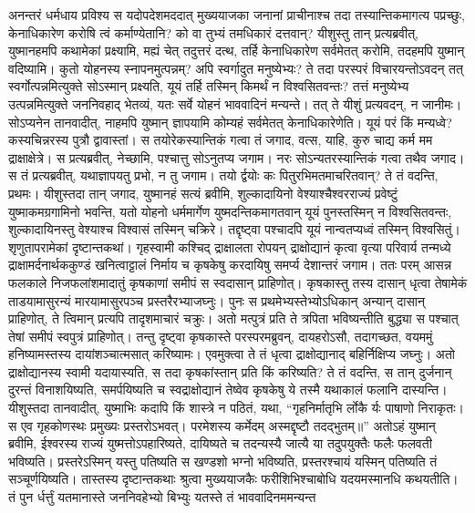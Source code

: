 \vakya अनन्तरं धर्मधाय प्रविश्य स यदोपदेशमददात् मुख्ययाजका जनानां प्राचीनाश्च तदा तस्यान्तिकमागत्य पप्रच्छुः, केनाधिकारेण करोषि त्वं कर्माण्येतानि? को वा तुभ्यं तमधिकारं दत्तवान्?
\vakya यीशुस्तु तान् प्रत्यब्रवीत्, युष्मानहमपि कथामेकां प्रक्ष्यामि, मह्यं चेत् तदुत्तरं दत्थ, तर्हि केनाधिकारेण सर्वमेतत् करोमि, तदहमपि युष्मान् वदिष्यामि।
\vakya कुतो योहनस्य स्नापनमुत्पन्नम्? अपि स्वर्गादुत मनुष्येभ्यः? ते तदा परस्परं विचारयन्तोऽवदन् तत् स्वर्गोत्पन्नमित्युक्ते सोऽस्मान् प्रक्ष्यति, यूयं तर्हि तस्मिन् किमर्थं न विश्वसितवन्तः?
\vakya तत्तं मनुष्येभ्य उत्पन्नमित्युक्ते जननिवहाद् भेतव्यं, यतः सर्वे योहनं भाववादिनं मन्यन्ते।
\vakya तत् ते यीशुं प्रत्यवदन्, न जानीमः। सोऽप्यनेन तानवादीत्, नाहमपि युष्मान् ज्ञापयामि कोम्यहं सर्वमेतत् केनाधिकारेणेति।
\vakya यूयं परं किं मन्यध्वे? कस्यचिन्नरस्य पुत्रौ द्वावास्तां। स तयोरेकस्यान्तिकं गत्वा तं जगाद, वत्स, याहि, कुरु चाद्य कर्म मम द्राक्षाक्षेत्रे।
\vakya स प्रत्यब्रवीत्, नेच्छामि, पश्चात्तु सोऽनुतप्य जगाम।
\vakya नरः सोऽन्यतरस्यान्तिकं गत्वा तथैव जगाद। स तं प्रत्यब्रवीत्, यथाज्ञापयतु प्रभो, न तु जगाम।
\vakya तयो र्द्वयोः कः पितुरभिमतमाचरितवान्? ते तं वदन्ति, प्रथमः। यीशुस्तदा तान् जगाद, युष्मानहं सत्यं ब्रवीमि, शुल्कादायिनो वेश्याश्चैश्वरराज्यं प्रवेष्टुं युष्माकमग्रगामिनो भवन्ति,
\vakya यतो योहनो धर्ममार्गेण युष्मदन्तिकमागतवान् यूयं पुनस्तस्मिन् न विश्वसितवन्तः, शुल्कादायिनस्तु वेश्याश्च विश्वासं तस्मिन् चक्रिरे। तद्दृष्ट्वा पश्चादपि यूयं नान्वतप्यध्वं तस्मिन् विश्वसितुं।
\vakya शृणुतापरामेकां दृष्टान्तकथां। गृहस्वामी कश्चिद् द्राक्षालता रोपयन् द्राक्षोद्यानं कृत्वा वृत्या परिवार्य तन्मध्ये द्राक्षामर्दनार्थककुण्डं खनित्वाट्टालं निर्माय च कृषकेषु करदायिषु समर्प्य देशान्तरं जगाम।
\vakya ततः परम् आसन्न फलकाले निजफलांशमादातुं कृषकाणां समीपं स स्वदासान् प्राहिणोत्।
\vakya कृषकास्तु तस्य दासान् धृत्वा तेषामेकं ताडयामासुरन्यं मारयामासुरपञ्च प्रस्तरैरभ्याजघ्नुः।
\vakya पुनः स प्रथमेभ्यस्तेभ्योऽधिकान् अन्यान् दासान् प्राहिणोत्, ते त्विमान् प्रत्यपि तादृशमाचारं चक्रुः।
\vakya अतो मत्पुत्रं प्रति ते त्रपिता भविष्यन्तीति बुद्ध्या स पश्चात् तेषां समीपं स्वपुत्रं प्राहिणोत्।
\vakya तन्तु दृष्ट्वा कृषकास्ते परस्परमब्रुवन्, दायहरोऽसौ, तदागच्छत, वयममुं हनिष्यामस्तस्य दायांशञ्चात्मसात् करिष्यामः।
\vakya एवमुक्त्वा ते तं धृत्वा द्राक्षोद्यानाद् बहिर्निक्षिप्य जघ्नुः।
\vakya अतो द्राक्षोद्यानस्य स्वामी यदायास्यति, स तदा कृषकांस्तान् प्रति किं करिष्यति?
\vakya ते तं वदन्ति, स तान् दुर्जनान् दुरन्तं विनाशयिष्यति, समर्पयिष्यति च स्वद्राक्षोद्यानं तेष्वेव कृषकेषु ये तस्मै यथाकालं फलानि दास्यन्ति।
\vakya यीशुस्तदा तानवादीत्, युष्माभिः कदापि किं शास्त्रे न पठितं, यथा, “गृहनिर्मातृभि र्लोकै र्यः पाषाणो निराकृतः। स एव गृहकोणस्थः प्रमुख्यः प्रस्तरोऽभवत्। परमेशस्य कर्मेदम् अस्मद्दृष्टौ तदद्भुतम्॥”
\vakya अतोऽहं युष्मान् ब्रवीमि, ईश्वरस्य राज्यं युष्मत्तोऽपहारिष्यते, दायिष्यते च तदन्यस्यै जात्यै या तदुपयुक्तैः फलैः फलवती भविष्यति।
\vakya प्रस्तरेऽस्मिन् यस्तु पतिष्यति स खण्डशो भग्नो भविष्यति, प्रस्तरश्चायं यस्मिन् पतिष्यति तं सञ्चूर्णयिष्यति।
\vakya तास्तस्य दृष्टान्तकथाः श्रुत्वा मुख्ययाजकैः फरीशिभिश्चाबोधि यदयमस्मानधि कथयतीति।
\vakya तं पुन र्धर्त्तुं यतमानास्ते जननिवहेभ्यो बिभ्युः यतस्ते तं भाववादिनममन्यन्त\eoc